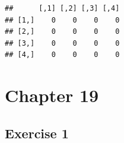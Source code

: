 \documentclass[
]{book}
\begin{document}
\begin{verbatim}
##      [,1] [,2] [,3] [,4]
## [1,]    0    0    0    0
## [2,]    0    0    0    0
## [3,]    0    0    0    0
## [4,]    0    0    0    0
\end{verbatim}

\hypertarget{chapter-19}{%
\section*{Chapter 19}\label{chapter-19}}

\hypertarget{exercise-1-12}{%
\subsection*{Exercise 1}\label{exercise-1-12}}
\end{document}

